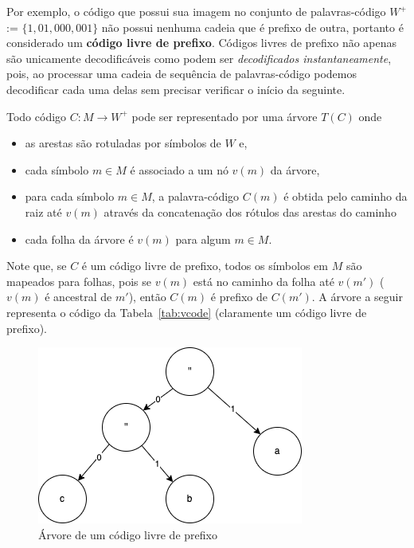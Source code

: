 Por exemplo, o código que possui sua imagem no conjunto de
palavras-código \emph{$W^+$} := $\{1, 01, 000, 001\}$ não possui
nenhuma cadeia que é prefixo de outra, portanto é considerado um
\textbf{código livre de prefixo}.  Códigos livres de prefixo não
apenas são unicamente decodificáveis como podem ser
\emph{decodificados instantaneamente}, pois, ao processar uma cadeia
de sequência de palavras-código podemos decodificar cada uma delas sem precisar verificar o início da seguinte.

Todo código $C\colon M\to W^+$ pode ser representado por uma árvore
$T(C)$ onde
\begin{itemize}
\item as arestas são rotuladas por símbolos de $W$ e,
\item cada símbolo $m \in M$ é associado a um nó $v(m)$ da árvore,
\item para cada símbolo $m\in M$, a palavra-código $C(m)$ é obtida
  pelo caminho da raiz até $v(m)$ através da concatenação dos rótulos
  das arestas do caminho
\item cada folha da árvore é $v(m)$ para algum $m\in M$.
\end{itemize}
Note que, se $C$ é um código livre de prefixo, todos os símbolos em
$M$ são mapeados para folhas, pois se $v(m)$ está no caminho da folha
até $v(m')$ ($v(m)$ é ancestral de $m'$), então $C(m)$ é prefixo de
$C(m')$. A árvore a seguir representa o código da
Tabela~\ref{tab:vcode} (claramente um código livre de prefixo).

\begin{figure}[h]
   \centering
   \includegraphics[scale=0.75]{figs/prefixtree.png}
    \caption{Árvore de um código livre de prefixo}
    \label{fig:prefixt}
 \end{figure}
